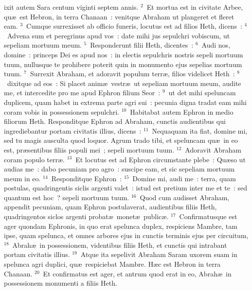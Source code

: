 \bchapter
{}ixit autem Sara centum viginti septem annis.
${}^{2}$~Et mortua est in civitate Arbee, qu\ae\ est Hebron, in terra Chanaan~: venitque Abraham ut plangeret et fleret eam.
${}^{3}$~Cumque surrexisset ab officio funeris, locutus est ad filios Heth, dicens~:
${}^{4}$~Advena sum et peregrinus apud vos~: date mihi jus sepulchri vobiscum, ut sepeliam mortuum meum.
${}^{5}$~Responderunt filii Heth, dicentes~:
${}^{6}$~Audi nos, domine~: princeps Dei es apud nos~: in electis sepulchris nostris sepeli mortuum tuum, nullusque te prohibere poterit quin in monumento ejus sepelias mortuum tuum.
${}^{7}$~Surrexit Abraham, et adoravit populum terr\ae , filios videlicet Heth~:
${}^{8}$~dixitque ad eos~: Si placet anim\ae\ vestr\ae\ ut sepeliam mortuum meum, audite me, et intercedite pro me apud Ephron filium Seor~:
${}^{9}$~ut det mihi speluncam duplicem, quam habet in extrema parte agri sui~: pecunia digna tradat eam mihi coram vobis in possessionem sepulchri.
${}^{10}$~Habitabat autem Ephron in medio filiorum Heth. Responditque Ephron ad Abraham, cunctis audientibus qui ingrediebantur portam civitatis illius, dicens~:
${}^{11}$~Nequaquam ita fiat, domine mi, sed tu magis ausculta quod loquor. Agrum trado tibi, et speluncam qu\ae\ in eo est, pr\ae sentibus filiis populi mei~; sepeli mortuum tuum.
${}^{12}$~Adoravit Abraham coram populo terr\ae .
${}^{13}$~Et locutus est ad Ephron circumstante plebe~: Qu\ae so ut audias me~: dabo pecuniam pro agro~: suscipe eam, et sic sepeliam mortuum meum in eo.
${}^{14}$~Responditque Ephron~:
${}^{15}$~Domine mi, audi me~: terra, quam postulas, quadringentis siclis argenti valet~: istud est pretium inter me et te~: sed quantum est hoc~? sepeli mortuum tuum.
${}^{16}$~Quod cum audisset Abraham, appendit pecuniam, quam Ephron postulaverat, audientibus filiis Heth, quadringentos siclos argenti probat\ae\ monet\ae\ public\ae .
${}^{17}$~Confirmatusque est ager quondam Ephronis, in quo erat spelunca duplex, respiciens Mambre, tam ipse, quam spelunca, et omnes arbores ejus in cunctis terminis ejus per circuitum,
${}^{18}$~Abrah\ae\ in possessionem, videntibus filiis Heth, et cunctis qui intrabant portam civitatis illius.
${}^{19}$~Atque ita sepelivit Abraham Saram uxorem suam in spelunca agri duplici, qu\ae\ respiciebat Mambre. H\ae c est Hebron in terra Chanaan.
${}^{20}$~Et confirmatus est ager, et antrum quod erat in eo, Abrah\ae\ in possessionem monumenti a filiis Heth.

